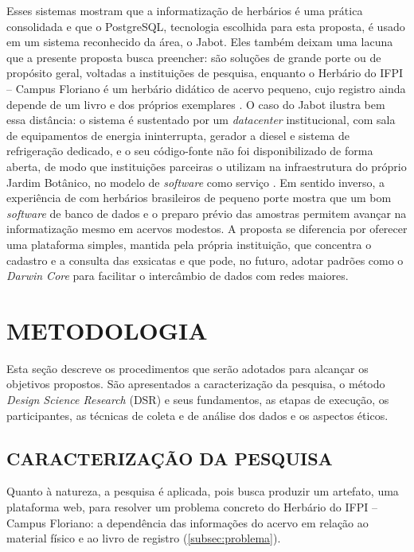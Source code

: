 \documentclass[
    12pt,        %
    openany,     %
    oneside,     %
    a4paper,     %
    english,     %
    french,      %
    spanish,     %
    brazil,      %
    article      %
]{abntex2}
\begin{document}
Esses sistemas mostram que a informatização de herbários é uma prática consolidada e que o PostgreSQL, tecnologia escolhida para esta proposta, é usado em um sistema reconhecido da área, o Jabot. Eles também deixam uma lacuna que a presente proposta busca preencher: são soluções de grande porte ou de propósito geral, voltadas a instituições de pesquisa, enquanto o Herbário do IFPI -- Campus Floriano é um herbário didático de acervo pequeno, cujo registro ainda depende de um livro e dos próprios exemplares \cite{lopes2023herbario}. O caso do Jabot ilustra bem essa distância: o sistema é sustentado por um \textit{datacenter} institucional, com sala de equipamentos de energia ininterrupta, gerador a diesel e sistema de refrigeração dedicado, e o seu código-fonte não foi disponibilizado de forma aberta, de modo que instituições parceiras o utilizam na infraestrutura do próprio Jardim Botânico, no modelo de \textit{software} como serviço \cite{silva2017jabot}. Em sentido inverso, a experiência de  com herbários brasileiros de pequeno porte mostra que um bom \textit{software} de banco de dados e o preparo prévio das amostras permitem avançar na informatização mesmo em acervos modestos. A proposta se diferencia por oferecer uma plataforma simples, mantida pela própria instituição, que concentra o cadastro e a consulta das exsicatas e que pode, no futuro, adotar padrões como o \textit{Darwin Core} para facilitar o intercâmbio de dados com redes maiores.

\section{METODOLOGIA}
\label{sec:metodologia}

Esta seção descreve os procedimentos que serão adotados para alcançar os objetivos propostos. São apresentados a caracterização da pesquisa, o método \textit{Design Science Research} (DSR) e seus fundamentos, as etapas de execução, os participantes, as técnicas de coleta e de análise dos dados e os aspectos éticos.

\subsection{CARACTERIZAÇÃO DA PESQUISA}
\label{subsec:caracterizacao}

Quanto à natureza, a pesquisa é aplicada, pois busca produzir um artefato, uma plataforma web, para resolver um problema concreto do Herbário do IFPI -- Campus Floriano: a dependência das informações do acervo em relação ao material físico e ao livro de registro (\autoref{subsec:problema}).
\end{document}
